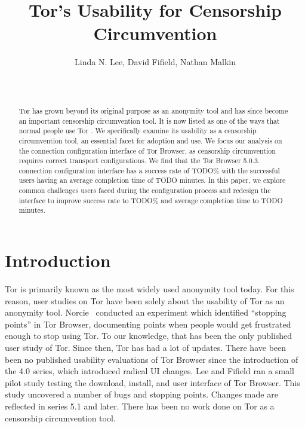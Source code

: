 \documentclass{template}
\begin{document}
\title{Tor's Usability for Censorship Circumvention}
\author{
 \alignauthor Linda N. Lee, David Fifield, Nathan Malkin \\
   \vspace{0.5em}
    \\
   \\
}
\maketitle

\begin{abstract}
\indent \indent
Tor has grown beyond its original purpose as an anonymity tool and has 
since become an important censorship circumvention tool. It is now listed
as one of the ways that normal people use Tor \cite{whotor}.
We specifically examine its usability as a censorship circumvention tool,
an essential facet for adoption and use. We focus our analysis on the connection 
configuration interface of Tor Browser, as censorship circumvention requires 
correct transport configurations. We find that the Tor Browser 5.0.3. connection
configuration interface has a success rate of {\color {red} TODO}\% with the 
successful users having an average completion time of {\color {red} TODO} minutes. 
In this paper, we explore common challenges users faced during the configuration
process and redesign the interface to improve success rate to {\color {red} TODO}\% 
and average completion time to {\color {red} TODO} minutes.
\end{abstract}


\section{Introduction}
Tor is primarily known as the most widely used anonymity tool today. 
For this reason, user studies on Tor have been solely about the usability of Tor as an
anonymity tool. Norcie~\cite{norcie2012eliminating} conducted an experiment which identified 
``stopping points'' in Tor Browser, documenting points when people would get frustrated enough
to stop using Tor. To our knowledge, that has been the only published user study of Tor. 
Since then, Tor has had a lot of updates. There have been been no published usability evaluations of
Tor Browser since the introduction of the 4.0 series, which introduced radical UI changes. 
Lee and Fifield \cite {uxsprint} ran a small pilot study testing the download, install, and user interface of Tor Browser. 
This study uncovered a number of bugs and stopping points. Changes made are reflected in series 
5.1 and later. There has been no work done on Tor as a censorship circumvention tool. 
\end{document}
